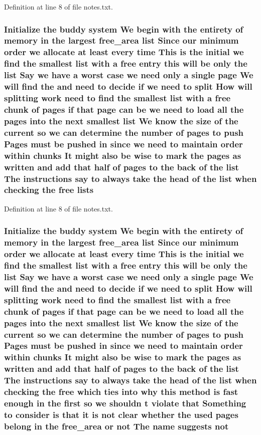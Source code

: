 Definition at line 8 of file notes.\+txt.

\subsubsection[{\texorpdfstring{lists}{lists}}]{\setlength{\rightskip}{0pt plus 5cm}Initialize the buddy system We begin with the entirety of memory {\bf in} the largest {\bf free\+\_\+area} {\bf list} Since our minimum {\bf order} we allocate at least every time This {\bf is} the initial we find the smallest {\bf list} with a free entry this will be only the {\bf list} Say we have a worst case we need only a single {\bf page} We will find the and need to decide if we need to {\bf split} How will splitting work need to find the smallest {\bf list} with a free {\bf chunk} of {\bf pages} if that {\bf page} can be we need to load all the {\bf pages} into the next smallest {\bf list} We know the size of the current {\bf so} we can determine the number of {\bf pages} to push Pages must be pushed {\bf in} since we need to maintain {\bf order} within chunks It might also be wise to mark the {\bf pages} as written and add that half of {\bf pages} to the back of the {\bf list} The instructions say to always take the head of the {\bf list} when checking the free lists}\hypertarget{notes_8txt_a714a30bc4feaa1e3997f8a58f898130c}{}\label{notes_8txt_a714a30bc4feaa1e3997f8a58f898130c}


Definition at line 8 of file notes.\+txt.

\subsubsection[{\texorpdfstring{not}{not}}]{\setlength{\rightskip}{0pt plus 5cm}Initialize the buddy system We begin with the entirety of memory {\bf in} the largest {\bf free\+\_\+area} {\bf list} Since our minimum {\bf order} we allocate at least every time This {\bf is} the initial we find the smallest {\bf list} with a free entry this will be only the {\bf list} Say we have a worst case we need only a single {\bf page} We will find the and need to decide if we need to {\bf split} How will splitting work need to find the smallest {\bf list} with a free {\bf chunk} of {\bf pages} if that {\bf page} can be we need to load all the {\bf pages} into the next smallest {\bf list} We know the size of the current {\bf so} we can determine the number of {\bf pages} to push Pages must be pushed {\bf in} since we need to maintain {\bf order} within chunks It might also be wise to mark the {\bf pages} as written and add that half of {\bf pages} to the back of the {\bf list} The instructions say to always take the head of the {\bf list} when checking the free which ties into why this method {\bf is} fast enough {\bf in} the {\bf first} {\bf so} we shouldn t violate that Something to consider {\bf is} that {\bf it} {\bf is} not clear whether the used {\bf pages} belong {\bf in} the {\bf free\+\_\+area} or not The name suggests not}\hypertarget{notes_8txt_ac0c86bc9d520a3d319a4c5083848fab9}{}\label{notes_8txt_ac0c86bc9d520a3d319a4c5083848fab9}


